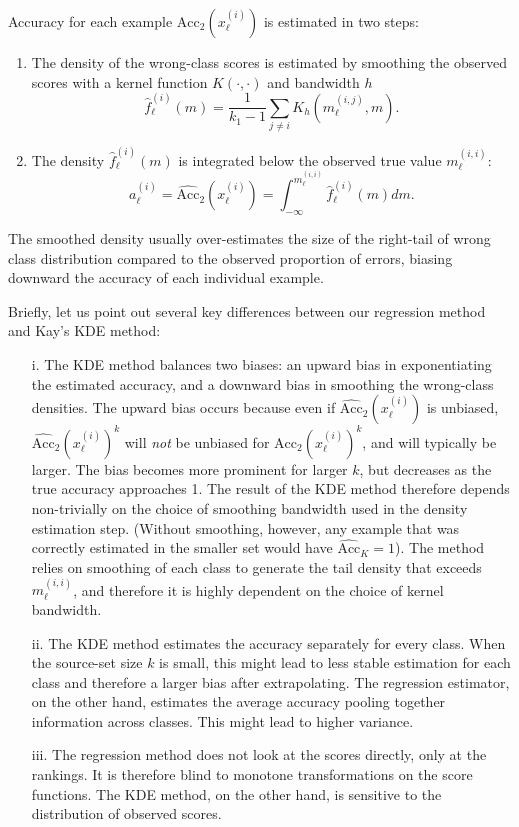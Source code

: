 \documentclass[twoside,11pt]{article}
\begin{document}
Accuracy for each example $\mathrm{Acc}_2(x_\ell^{(i)})$ is estimated in two steps:
\begin{enumerate}
\item The density of the wrong-class scores is estimated by smoothing the observed scores with a kernel function $K(\cdot,\cdot)$ and bandwidth $h$
\[\hat{f}_\ell^{(i)}(m) = \frac{1}{k_1-1} \sum_{j\neq i} K_h(m_\ell^{(i,j)}, m).\]
\item The density $\hat{f}_\ell^{(i)}(m)$ is integrated below the observed true value $m_\ell^{(i,i)}$:
\[a_\ell^{(i)} = \widehat{\mathrm{Acc}}_2(x_\ell^{(i)}) = \int_{-\infty}^{m_\ell^{(i,i)}} \hat{f}_\ell^{(i)}(m)dm.\]
\end{enumerate}
The smoothed density usually over-estimates the size of the right-tail of wrong class distribution compared
to the observed proportion of errors, biasing downward the accuracy of each individual example.

Briefly, let us point out several key differences between our regression method and Kay's KDE method:
\begin{enumerate}
\item[i.] The KDE method balances two biases: an upward bias in exponentiating the estimated accuracy, and a downward bias
in smoothing the wrong-class densities.
The upward bias occurs because even if $\widehat{\mathrm{Acc}}_2(x_\ell^{(i)})$ is unbiased,
$\widehat{\mathrm{Acc}}_2(x_\ell^{(i)})^k$ will \emph{not} be unbiased for  $\mathrm{Acc}_2(x_\ell^{(i)})^k$, and will typically be larger.
The bias becomes more prominent for larger $k$, but decreases as the true accuracy approaches 1.
The result of the KDE method therefore depends non-trivially on the choice of smoothing bandwidth used in the density estimation step.
(Without smoothing, however, any example that was correctly estimated in the smaller set would have $\widehat{\mathrm{Acc}}_K = 1$). The method relies on smoothing of each class to generate the tail density that exceeds $m_\ell^{(i,i)}$, and therefore it is highly dependent on the choice of kernel bandwidth.

\item[ii.] The KDE method estimates the accuracy separately for every class. When the source-set size $k$ is small, this might lead to less stable estimation for each class
and therefore a larger bias after extrapolating. The regression estimator, on the other hand, estimates the average accuracy pooling together information across classes. This might lead to higher variance.

\item[iii.] The regression method does not look at the scores directly, only at the rankings. It is therefore blind to monotone transformations
on the score functions. The KDE method, on the other hand, is sensitive to the distribution of observed scores.
\end{enumerate}
\end{document}
